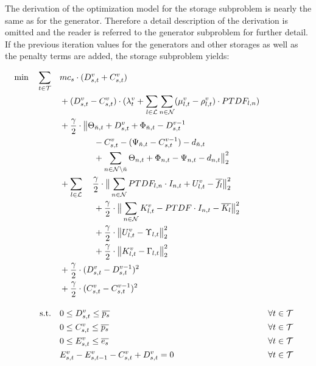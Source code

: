 The derivation of the optimization model for the storage subproblem is nearly the same as for the generator. Therefore a detail description of the derivation is omitted and the reader is referred to the generator subproblem for further detail. If the previous iteration values for the generators and other storages as well as the penalty terms are added, the storage subproblem yields:

 \begin{subequations}
	\begin{align}
		 \min \quad \sum_{t\in\mathcal{T}} \quad & mc_s \cdot (D_{s,t}^v + C_{s,t}^v)\label{eq:sub:stor}\\
		 & + (D_{s,t}^v - C_{s,t}^v) \cdot (\lambda_t^v + \sum_{l \in \mathcal{L}} \sum_{n \in \mathcal{N}} (\mu_{l,t}^v - \rho_{l,t}^v) \cdot PTDF_{l,n}) \nonumber \\ 
		 & + \frac{\gamma}{2} \cdot \big\| \Theta_{\breve{n},t} + D_{s,t}^v + \Phi_{\breve{n},t} - D_{s,t}^{v-1} \nonumber \\
		 & \qquad \qquad - C_{s,t}^v - (\Psi_{\breve{n},t} - C_{s,t}^{v-1}) - d_{\breve{n},t} \nonumber \\
		 & \qquad \qquad + \sum_{n \in \mathcal{N} \setminus \breve{n}} \Theta_{n,t} + \Phi_{n,t} - \Psi_{n,t} - d_{n,t} \big\|^2_2 \nonumber \\
		 & + \sum_{l \in \mathcal{L}} \quad \frac{\gamma}{2} \cdot \big\| \sum_{n \in \mathcal{N}} PTDF_{l,n} \cdot I_{n,t} + U_{l,t}^v - \overline{f_l}\big\|^2_2 \nonumber \\
		 & \qquad \qquad + \frac{\gamma}{2} \cdot \big\| \sum_{n \in \mathcal{N}} K_{l,t}^v - PTDF \cdot I_{n,t} - \overline{K_l}\big\|^2_2\nonumber \\
		 & \qquad \qquad + \frac{\gamma}{2} \cdot \big\|U_{l,t}^v - \Upsilon_{l,t}  \big\|^2_2 \nonumber\\
		 & \qquad \qquad + \frac{\gamma}{2} \cdot \big\|K_{l,t}^v - \Gamma_{l,t}  \big\|^2_2 \nonumber \\
		 & + \frac{\gamma}{2} \cdot (D_{s,t}^v - D_{s,t}^{v-1} )^2 \nonumber \\
		 & + \frac{\gamma}{2} \cdot (C_{s,t}^v - C_{s,t}^{v-1} )^2 \nonumber \\[10pt]
		 \text{s.t.} \quad & 0 \leq D_{s,t}^v \leq \overline{p_s} && \forall t \in \mathcal{T} \\
		 & 0 \leq C_{s,t}^v \leq \overline{p_s} && \forall t \in \mathcal{T}\\
		 & 0 \leq E_{s,t}^v \leq \overline{e_s} && \forall t \in \mathcal{T}\\
		 & E_{s,t}^v - E_{s,t-1}^v - C_{s,t}^v + D_{s,t}^v = 0 && \forall t \in \mathcal{T}
	\end{align}
\end{subequations}

